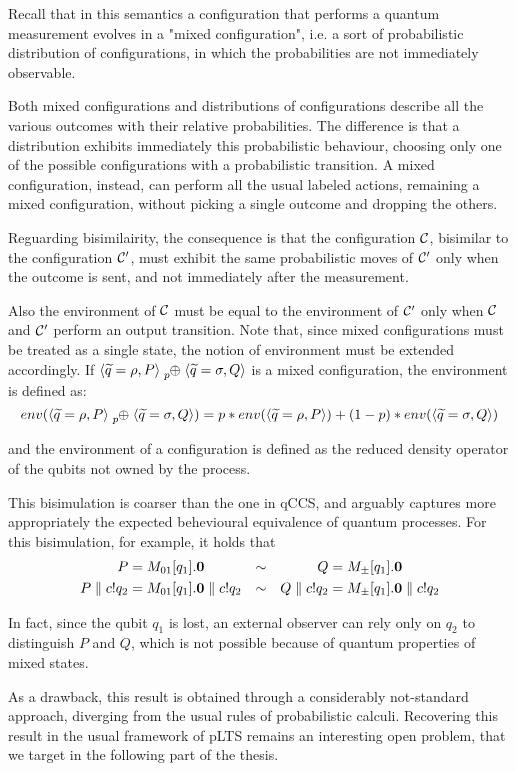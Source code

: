 Recall that in this semantics a configuration that performs a quantum  measurement evolves in a "mixed configuration", i.e. a sort of probabilistic distribution of configurations, in which the probabilities are not immediately observable.  


Both mixed configurations and distributions of configurations describe all the various outcomes with their relative probabilities. The difference is that a distribution exhibits immediately this probabilistic behaviour, choosing only one of the possible configurations with a probabilistic transition. A mixed configuration, instead, can perform all the usual labeled actions, remaining a mixed configuration, without picking a single outcome and dropping the others.


Reguarding bisimilairity, the consequence is that the configuration $\mathcal{C}$, bisimilar to the configuration $\mathcal{C}'$, must exhibit the same probabilistic moves of $\mathcal{C}'$ only when the outcome is sent, and not immediately after the measurement.

Also the environment of $\mathcal{C}$ must be equal to the environment of $\mathcal{C}'$ only when $\mathcal{C}$ and $\mathcal{C}'$ perform an output transition. Note that, since mixed configurations must be treated as a single state, the notion of environment must be extended accordingly. If $\confw{\widetilde{q} = \rho, P} \psum{p} \confw{\widetilde{q} = \sigma, Q}$ is a mixed configuration, the environment is defined as:
\[env(\confw{\widetilde{q} = \rho, P} \psum{p} \confw{\widetilde{q} = \sigma, Q}) = p*env(\confw{\widetilde{q} = \rho, P}) + (1-p)*env(\confw{\widetilde{q} = \sigma, Q})\]

and the environment of a configuration is defined as the reduced density operator of the qubits not owned by the process.

This bisimulation is coarser than the one in qCCS, and arguably captures more appropriately the expected behevioural equivalence of quantum processes. For this bisimulation, for example, it holds that 
\begin{align*}
 P &= M_{01}[q_1].\mathbf{0} &\sim & & Q &= M_\pm[q_1].\mathbf{0} \\ 
 P \parallel c!q_2 &=  M_{01}[q_1].\mathbf{0} \parallel c!q_2 &\sim & & Q \parallel c!q_2 &=  M_\pm[q_1].\mathbf{0} \parallel c!q_2 
\end{align*} 

In fact, since the qubit $q_1$ is lost, an external observer can rely only on $q_2$ to distinguish $P$ and $Q$, which is not possible because of quantum properties of mixed states. 

As a drawback, this result is obtained through a considerably not-standard approach, diverging from the usual rules of probabilistic calculi. Recovering this result in the usual framework of pLTS remains an interesting open problem, that we target in the following part of the thesis.
